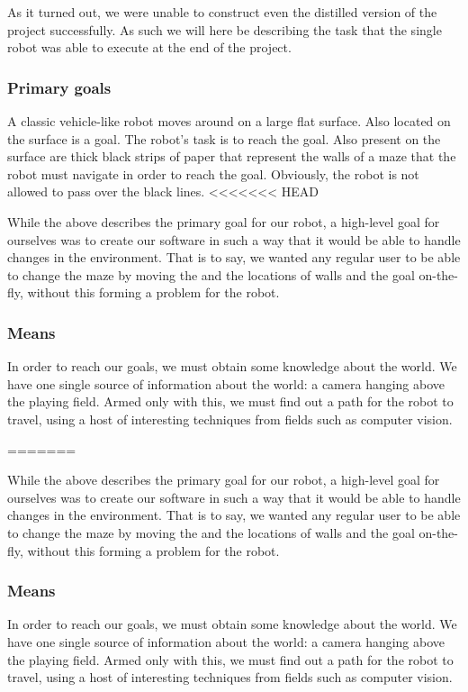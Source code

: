 \documentclass[10pt, abstracton]{scrartcl}
\begin{document}
As it turned out, we were unable to construct even the distilled version of the project successfully. As such we will here be describing the task that the single robot was able to execute at the end of the project.

\subsubsection{Primary goals}
A classic vehicle-like robot moves around on a large flat surface. Also located on the surface is a goal. The robot's task is to reach the goal. Also present on the surface are thick black strips of paper that represent the walls of a maze that the robot must navigate in order to reach the goal. Obviously, the robot is not allowed to pass over the black lines.
<<<<<<< HEAD

While the above describes the primary goal for our robot, a high-level goal for ourselves was to create our software in such a way that it would be able to handle changes in the environment. That is to say, we wanted any regular user to be able to change the maze by moving the and the locations of walls and the goal on-the-fly, without this forming a problem for the robot.

\subsubsection{Means}

In order to reach our goals, we must obtain some knowledge about the world. We have one single source of information about the world: a camera hanging above the playing field. Armed only with this, we must find out a path for the robot to travel, using a host of interesting techniques from fields such as computer vision.

=======

While the above describes the primary goal for our robot, a high-level goal for ourselves was to create our software in such a way that it would be able to handle changes in the environment. That is to say, we wanted any regular user to be able to change the maze by moving the and the locations of walls and the goal on-the-fly, without this forming a problem for the robot.

\subsubsection{Means}

In order to reach our goals, we must obtain some knowledge about the world. We have one single source of information about the world: a camera hanging above the playing field. Armed only with this, we must find out a path for the robot to travel, using a host of interesting techniques from fields such as computer vision.
\end{document}
